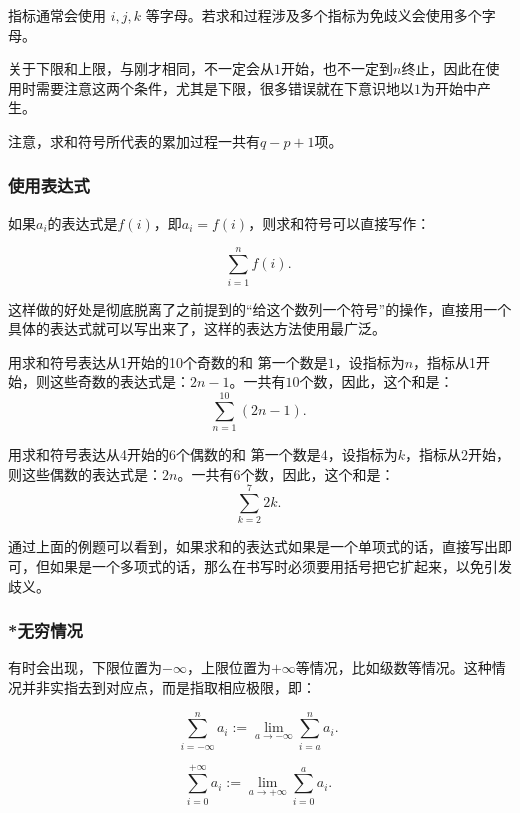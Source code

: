 指标通常会使用 $i,j,k$ 等字母。若求和过程涉及多个指标为免歧义会使用多个字母。

关于下限和上限，与刚才相同，不一定会从$1$开始，也不一定到$n$终止，因此在使用时需要注意这两个条件，尤其是下限，很多错误就在下意识地以$1$为开始中产生。

注意，求和符号所代表的累加过程一共有$q-p+1$项。

\subsubsection{使用表达式}

如果$a_i$的表达式是$f(i)$，即$a_i=f(i)$，则求和符号可以直接写作：

\begin{equation}
\sum_{i=1}^n f(i) .~
\end{equation}

这样做的好处是彻底脱离了之前提到的“给这个数列一个符号”的操作，直接用一个具体的表达式就可以写出来了，这样的表达方法使用最广泛。

\begin{example}{用求和符号表达从1开始的10个奇数的和}
第一个数是$1$，设指标为$n$，指标从1开始，则这些奇数的表达式是：$2n-1$。一共有$10$个数，因此，这个和是：
$$\sum_{n=1}^{10}(2n-1).~$$
\end{example}

\begin{example}{用求和符号表达从4开始的6个偶数的和}
第一个数是$4$，设指标为$k$，指标从$2$开始，则这些偶数的表达式是：$2n$。一共有$6$个数，因此，这个和是：
$$\sum_{k=2}^{7}{2k} .~$$
\end{example}

通过上面的例题可以看到，如果求和的表达式如果是一个单项式的话，直接写出即可，但如果是一个多项式的话，那么在书写时必须要用括号把它扩起来，以免引发歧义。

\subsubsection{*无穷情况}
有时会出现，下限位置为$-\infty$，上限位置为$+\infty$等情况，比如级数等情况。这种情况并非实指去到对应点，而是指取相应极限，即：

\begin{equation}
\sum_{i=-\infty}^n a_i:= \lim_{a\to-\infty}\sum_{i=a}^n a_i.~
\end{equation}

\begin{equation}
\sum_{i=0}^{+\infty} a_i:= \lim_{a\to+\infty}\sum_{i=0}^a a_i.~
\end{equation}

